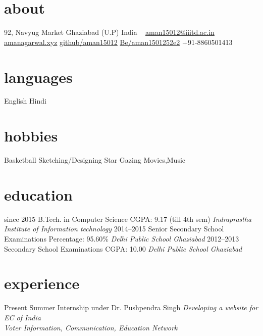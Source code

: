 \documentclass[]{friggeri-cv}
\begin{document}

\begin{aside}
  \section{about}
    92, Navyug Market
    Ghaziabad (U.P)
    India
    ~
    \href{mailto:aman15012@iiitd.ac.in}{aman15012@iiitd.ac.in}
    \href{amanagarwal.xyz}{amanagarwal.xyz}
    \href{https://github.com/aman15012}{github/aman15012}
    \href{https://www.behance.net/aman1501252e2}{Be/aman1501252e2}
    +91-8860501413
  \section{languages}
    English
    Hindi
  \section{hobbies}
    Basketball
    Sketching/Designing
    Star Gazing
    Movies,Music
    
\end{aside}



\section{education}

\begin{entrylist}
  \entry
    {since 2015}
    {B.Tech. {\normalfont in Computer Science}}
    {CGPA: 9.17 (till 4th sem)}
    {\emph{Indraprastha Institute of Information technology}}
  \entry
    {2014–2015}
    {Senior Secondary School Examinations}
    {Percentage: 95.60\%}
    {\emph{Delhi Public School Ghaziabad}}
  \entry
    {2012–2013}
    {Secondary School Examinations}
    {CGPA: 10.00}
    {\emph{Delhi Public School Ghaziabad}}
\end{entrylist}

\section{experience}

\begin{entrylist}
  \entry
    {Present}
    {Summer Internship}
    {under Dr. Pushpendra Singh}
    {\emph{Developing a website for EC of India\\
    Voter Information, Communication, Education Network }}
    
\end{entrylist}
\end{document}
